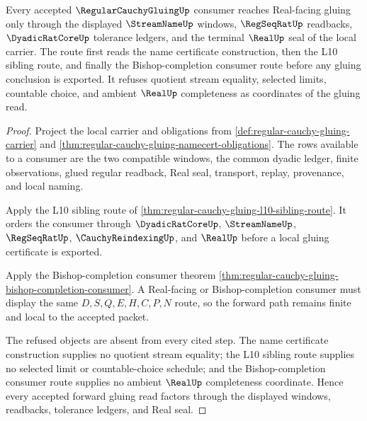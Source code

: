 \begin{theorem}
\label{thm:regular-cauchy-gluing-l10-forward-route}
Every accepted $\RegularCauchyGluingUp$ consumer reaches Real-facing gluing only through the displayed $\StreamNameUp$ windows, $\RegSeqRatUp$ readbacks, $\DyadicRatCoreUp$ tolerance ledgers, and the terminal $\RealUp$ seal of the local carrier. The route first reads the name certificate construction, then the L10 sibling route, and finally the Bishop-completion consumer route before any gluing conclusion is exported. It refuses quotient stream equality, selected limits, countable choice, and ambient $\RealUp$ completeness as coordinates of the gluing read.
\end{theorem}
\begin{proof}
Project the local carrier and obligations from \autoref{def:regular-cauchy-gluing-carrier} and \autoref{thm:regular-cauchy-gluing-namecert-obligations}. The rows available to a consumer are the two compatible windows, the common dyadic ledger, finite observations, glued regular readback, Real seal, transport, replay, provenance, and local naming.

Apply the L10 sibling route of \autoref{thm:regular-cauchy-gluing-l10-sibling-route}. It orders the consumer through $\DyadicRatCoreUp$, $\StreamNameUp$, $\RegSeqRatUp$, $\CauchyReindexingUp$, and $\RealUp$ before a local gluing certificate is exported.

Apply the Bishop-completion consumer theorem \autoref{thm:regular-cauchy-gluing-bishop-completion-consumer}. A Real-facing or Bishop-completion consumer must display the same $D,S,Q,E,H,C,P,N$ route, so the forward path remains finite and local to the accepted packet.

The refused objects are absent from every cited step. The name certificate construction supplies no quotient stream equality; the L10 sibling route supplies no selected limit or countable-choice schedule; and the Bishop-completion consumer route supplies no ambient $\RealUp$ completeness coordinate. Hence every accepted forward gluing read factors through the displayed windows, readbacks, tolerance ledgers, and Real seal.
\end{proof}
